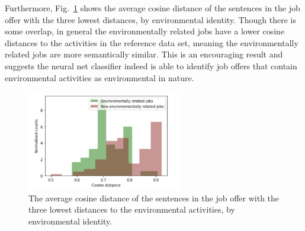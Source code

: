 Furthermore, Fig.~\ref{fig:ActivityGreen} shows the average cosine distance of the sentences in the job offer with the three lowest distances, by environmental identity. Though there is some overlap, in general the environmentally related jobs have a lower cosine distances to the activities in the reference data set, meaning the environmentally related jobs are more semantically similar. This is an encouraging result and suggests the neural net classifier indeed is able to identify job offers that contain environmental activities as environmental in nature. 

\begin{figure}[htbp]
  \centering
    \includegraphics[width=0.6\textwidth]{figures/ActivityGreen.pdf}
    \caption{
    The average cosine distance of the sentences in the job offer with the three lowest distances to the environmental activities, by environmental identity. 
    }
\label{fig:ActivityGreen}
\end{figure}







